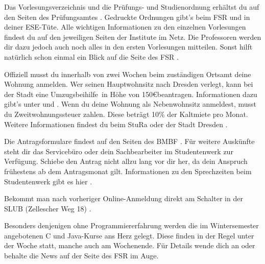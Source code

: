 \begin{itemize}[leftmargin=*]
Das Vorlesungsverzeichnis und die Prüfungs- und Studienordnung erhältst du auf den Seiten des Prüfungsamtes .
Gedruckte Ordnungen gibt's beim FSR und in deiner ESE-Tüte.
Alle wichtigen Informationen zu den einzelnen Vorlesungen findest du auf den jeweiligen Seiten der Institute im Netz.
Die Professoren werden dir dazu jedoch auch noch alles in den ersten Vorlesungen mitteilen. Sonst hilft natürlich schon einmal ein Blick auf die Seite des FSR .

Offiziell musst du innerhalb von zwei Wochen beim zuständigen Ortsamt  deine Wohnung anmelden.
Wer seinen Hauptwohnsitz nach Dresden verlegt, kann bei der Stadt eine \glqq Umzugsbeihilfe\grqq\ in Höhe von 150\euro beantragen.
Informationen dazu gibt's unter  und .
Wenn du deine Wohnung als Nebenwohnsitz anmeldest, musst du Zweitwohnungssteuer zahlen. Diese beträgt 10\% der Kaltmiete pro Monat. Weitere Informationen findest du beim StuRa  oder der Stadt Dresden .

Die Antragsformulare findest auf den Seiten des BMBF . Für weitere Auskünfte steht dir das Servicebüro oder dein Sachbearbeiter im Studentenwerk zur Verfügung.
Schiebe den Antrag nicht allzu lang vor dir her, da dein Anspruch frühestens ab dem Antragsmonat gilt.
Informationen zu den Sprechzeiten beim Studentenwerk gibt es hier .

Bekommt man nach vorheriger Online-Anmeldung direkt am Schalter in der SLUB (Zellescher Weg 18) .

Besonders denjenigen ohne Programmiererfahrung werden die im Wintersemester angebotenen C und Java-Kurse ans Herz gelegt.
Diese finden in der Regel unter der Woche statt, manche auch am Wochenende.
Für Details wende dich an  oder behalte die News auf der Seite des FSR  im Auge.


\end{itemize}
